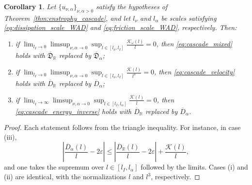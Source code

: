 \documentclass[11pt,a4paper]{article}
\numberwithin{equation}{section}
\newtheorem{cor}[theorem]{Corollary}
\numberwithin{theorem}{section}
\numberwithin{remark}{section}
\numberwithin{definition}{section}
\begin{document}
\begin{cor}\label{cor:channel}
Let $\{u_{\nu,\alpha}\}_{\nu,\alpha>0}$ satisfy the hypotheses of
Theorem~\ref{thm:enstrophy_cascade}, and let $l_\nu$ and $l_\alpha$
be scales satisfying \eqref{eq:dissipation_scale_WAD} and
\eqref{eq:friction_scale_WAD}, respectively. Then:
\begin{enumerate}
    \item[(i)] if
    $\displaystyle \lim_{l_I \to 0}\limsup_{\nu,\alpha \to 0} \sup_{l \in [l_\nu, l_I]} \frac{\mathcal{K}_{\omega}(l)}{l} = 0$,
    then \eqref{eq:cascade_mixed} holds with $\overline{\mathfrak{D}}_{\mathbb{R}}$ replaced by $\overline{\mathfrak{D}}_{\alpha}$;
    \item[(ii)] if
    $\displaystyle \lim_{l_I \to 0}\limsup_{\nu,\alpha \to 0} \sup_{l \in [l_\nu, l_I]} \frac{\mathcal{K}(l)}{l^3} = 0$,
    then \eqref{eq:cascade_velocity} holds with $\overline{D}_{\mathbb{R}}$ replaced by $\overline{D}_{\alpha}$;
    \item[(iii)] if
    $\displaystyle \lim_{l_I \to \infty}\limsup_{\nu,\alpha \to 0} \sup_{l \in [l_I, l_\alpha]} \frac{\mathcal{K}(l)}{l} = 0$,
    then \eqref{eq:cascade_energy_inverse} holds with $\overline{D}_{\mathbb{R}}$ replaced by $\overline{D}_{\alpha}$.
\end{enumerate}
\end{cor}

\begin{proof}
Each statement follows from the triangle inequality. For instance, in case
(iii),
\begin{equation*}
    \left|\frac{\overline{D}_{\alpha}(l)}{l} - 2\varepsilon\right| \le \left|\frac{\overline{D}_{\mathbb{R}}(l)}{l} - 2\varepsilon\right| + \frac{\mathcal{K}(l)}{l},
\end{equation*}
and one takes the supremum over $l \in [l_I, l_\alpha]$ followed by the limits.
Cases (i) and (ii) are identical, with the normalizations $l$ and $l^3$, respectively.
\end{proof}
\end{document}
